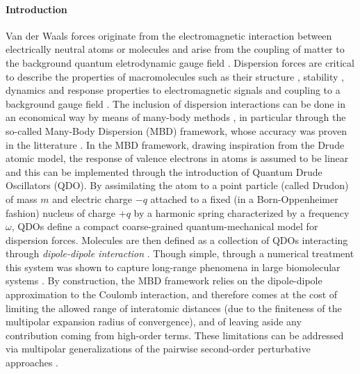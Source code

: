 \documentclass[reprint, amsmath, amssymb, floatfix, aps, pra]{revtex4-2}
\begin{document}
\paragraph*{Introduction}

    Van der Waals forces originate from the electromagnetic interaction between electrically neutral atoms or molecules \cite{margenau2013theory,kaplan2006intermolecular,stone2013theory,hirschfelder2009intermolecular} and arise from the coupling of matter to the background quantum eletrodynamic gauge field \cite{casimir1948influence,buhmann2013dispersion,buhmann2007dispersion,compagno1995atom,passante2018dispersion, cohen1997photons,cohen1998atom,bookpreparata,salam2009molecular,craig1998t}. Dispersion forces are critical to describe the properties of macromolecules such as their structure \cite{hoja2019reliable}, stability \cite{hoja2018first,mortazavi2018structure}, dynamics \cite{stohr2019quantum,reilly2014role,galante2021anisotropic} and response properties to electromagnetic signals \cite{kleshchonok2018tailoring, ambrosetti2022optical} and coupling to a background gauge field \cite{Karimpour_2022, karimpour2021comprehensive}. The inclusion of dispersion interactions can be done in an economical way by means of many-body methods \cite{richardson1975dispersion,mahanty1973dispersion,woods2016materials,tkatchenko2015current,ren2012random,harl2009accurate,dobson2012calculation,parsegian2005van,becke2006simple,becke2006exchange,grimme2010consistent,grimme2006semiempirical,tkatchenko2012accurate,massa2021many}, in particular through the so-called Many-Body Dispersion (MBD) framework, whose accuracy was proven in the litterature \cite{tkatchenko2012accurate,ambrosetti2014long}. In the MBD framework, drawing inspiration from the Drude atomic model, the response of valence electrons in atoms is assumed to be linear and this can be implemented through the introduction of Quantum Drude Oscillators (QDO). By assimilating the atom to a point particle (called Drudon) of mass $m$ and electric charge $-q$ attached to a fixed (in a Born-Oppenheimer fashion) nucleus of charge $+q$ by a harmonic spring characterized by a frequency $\omega$, QDOs define a compact coarse-grained quantum-mechanical model for dispersion forces. Molecules are then defined as a collection of QDOs interacting through \textit{dipole-dipole interaction} \cite{doi:10.1063/1.1743992, doi:10.1063/1.1743991}. Though simple, through a numerical treatment this system was shown to capture long-range phenomena in large biomolecular systems \cite{https://doi.org/10.48550/arxiv.2205.11549}. By construction, the MBD framework relies on the dipole-dipole approximation to the Coulomb interaction, and therefore comes at the cost of limiting the allowed range of interatomic distances (due to the finiteness of the multipolar expansion radius of convergence), and of leaving aside any contribution coming from high-order terms. These limitations can be addressed via multipolar generalizations of the pairwise second-order perturbative approaches \cite{massa2021beyond,massa2021many,becke2006simple,becke2006exchange}.
\end{document}
